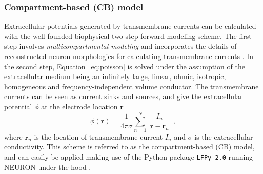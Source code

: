 \documentclass[preprint,10pt,authoryear]{elsarticle}
\begin{document}
\subsubsection{Compartment-based (CB) model}
Extracellular potentials generated by transmembrane currents can be calculated with the well-founded biophysical two-step forward-modeling scheme. The first step involves \textit{multicompartmental modeling} and incorporates the details of reconstructed neuron morphologies for calculating transmembrane currents \citep{STERRATT2011}. In the second step, Equation~\eqref{eq:poisson} is solved under the assumption of the extracellular medium being an infinitely large, linear, ohmic, isotropic, homogeneous and frequency-independent volume conductor. The transmembrane currents can be seen as current sinks and sources, and give the extracellular potential $\phi$ at the electrode location $\mathbf{r}$
\begin{equation}
\phi(\mathbf{r}) = \frac{1}{4 \pi \sigma}\sum_{n=1}^N \frac{I_n}{|\mathbf{r} - \mathbf{r}_n|}~,
\end{equation}
where $\mathbf{r}_n$ is the location of transmembrane current $I_n$ and $\sigma$ is the extracellular conductivity.
This scheme is referred to as the compartment-based (CB) model, and can easily be applied making use of the Python package \texttt{LFPy 2.0} running NEURON under the hood \citep{HAGEN2017,CARNEVALE2006}.
\end{document}
